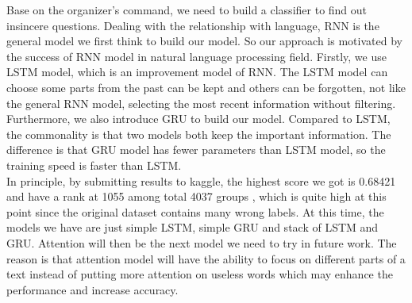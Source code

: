 \documentclass{article}
\begin{document}
\noindent Base on the organizer's command, we need to build a classifier to find out insincere questions. Dealing with the relationship with language, RNN is the general model we first think  to build our model. So our approach is motivated by the success of RNN model in natural language processing field. Firstly, we  use LSTM model, which is an improvement model of RNN. The LSTM model can choose some parts from the past can be kept and others can be forgotten, not like the general RNN model, selecting the most recent information without filtering. Furthermore, we also introduce GRU to build our model. Compared to LSTM, the commonality is that two models both keep the important information. The difference is that GRU model has fewer parameters than LSTM model, so the training speed is faster than LSTM.\\

\noindent In principle, by submitting results to kaggle, the highest score we got is 0.68421 and have a rank at 1055 among total 4037 groups , which is quite high at this point since the original dataset contains many wrong labels. At this time, the models we have are just simple LSTM, simple GRU and stack of LSTM and GRU. Attention will then be the next model we need to try in future work. The reason is that attention model will have the ability to focus on different parts of a text instead of putting more attention on useless words which may enhance the performance and increase accuracy.\\
\end{document}
